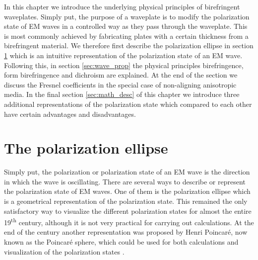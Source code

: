 \label{ch:theory}
In this chapter we introduce the underlying physical principles of birefringent waveplates. Simply put, the purpose of a waveplate is to modify the polarization state of EM waves in a controlled way as they pass through the waveplate. This is most commonly achieved by fabricating plates with a certain thickness from a birefringent material. We therefore first describe the polarization ellipse in section \ref{sec:polellipse} which is an intuitive representation of the polarization state of an EM wave. Following this, in section \ref{sec:wave_prop} the physical principles birefringence, form birefringence and dichroism are explained. At the end of the section we discuss the Fresnel coefficients in the special case of non-aligning anisotropic media. In the final section \ref{sec:math_desc} of this chapter we introduce three additional representations of the polarization state which compared to each other have certain advantages and disadvantages.

\section{The polarization ellipse}
\label{sec:polellipse}
Simply put, the polarization or polarization state of an EM wave is the direction in which the wave is oscillating. There are several ways to describe or represent the polarization state of EM waves. One of them is the polarization ellipse which is a geometrical representation of the polarization state. This remained the only satisfactory way to visualize the different polarization states for almost the entire 19\textsuperscript{th} century, although it is not very practical for carrying out calculations. At the end of the century another representation was proposed by Henri Poincaré, now known as the Poincaré sphere, which could be used for both calculations and visualization of the polarization states \cite{Collett2008a}. 

